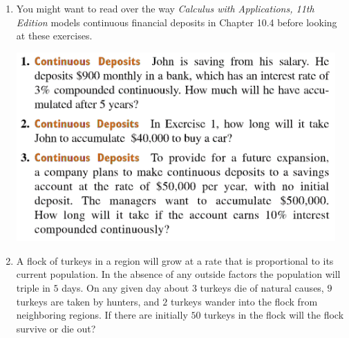 \begin{enumerate}
    \item %
        You might want to read over the way 
        \emph{Calculus with Applications, 11th Edition}
        models continuous financial deposits in Chapter 10.4 
        before looking at these exercises.
        \begin{center}
            \includegraphics[width=0.96\textwidth]{screenshots/123.png}
        \end{center}

    \newpage

    \item 
        A flock of turkeys in a region will grow at a rate 
        that is proportional to its current population. 
        In the absence of any outside factors 
        the population will triple in $5$ days. 
        On any given day about $3$ turkeys die of natural causes,
        $9$ turkeys are taken by hunters, and $2$ turkeys 
        wander into the flock from neighboring regions.
        If there are initially $50$ turkeys in the flock 
        will the flock survive or die out? 


\end{enumerate}
